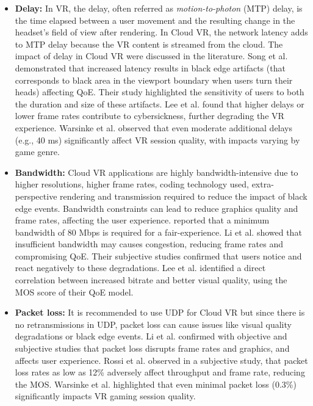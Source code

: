 \begin{itemize}
    \item \textbf{Delay:} In VR, the delay, often referred as \textit{motion-to-photon} (MTP) delay, is the time elapsed between a user movement and the resulting change in the headset's field of view after rendering. In Cloud VR, the network latency adds to MTP delay because the VR content is streamed from the cloud. The impact of delay in Cloud VR were discussed in the literature. Song et al. \cite{song2022impact} demonstrated that increased latency results in black edge artifacts (that corresponds to black area in the viewport boundary when users turn their heads) affecting QoE. Their study highlighted the sensitivity of users to both the duration and size of these artifacts. Lee et al. \cite{lee2024adaptive} found that higher delays or lower frame rates contribute to cybersickness, further degrading the VR experience. Warsinke et al. \cite{warsinke2024vr} observed that even moderate additional delays (e.g., 40 ms) significantly affect VR session quality, with impacts varying by game genre.
    
    \item \textbf{Bandwidth:} Cloud VR applications are highly bandwidth-intensive due to higher resolutions, higher frame rates, coding technology used, extra-perspective rendering and transmission required to reduce the impact of black edge events. Bandwidth constraints can lead to reduce graphics quality and frame rates, affecting the user experience. \cite{huawei} reported that a minimum bandwidth of 80 Mbps is required for a fair-experience. Li et al. \cite{li2020performance} showed that insufficient bandwidth may causes congestion, reducing frame rates and compromising QoE. Their subjective studies confirmed that users notice and react negatively to these degradations. Lee et al. \cite{lee2024adaptive} identified a direct correlation between increased bitrate and better visual quality, using the MOS score of their QoE model.  

    \item \textbf{Packet loss:} It is recommended to use UDP for Cloud VR but since there is no retransmissions in UDP, packet loss can cause issues like visual quality degradations or black edge events. Li et al. \cite{li2020performance} confirmed with objective and subjective studies that packet loss disrupts frame rates and graphics, and affects user experience. Rossi et al. \cite{rossi2024subjective} observed in a subjective study, that packet loss rates as low as 12\% adversely affect throughput and frame rate, reducing the MOS. Warsinke et al. \cite{warsinke2024vr} highlighted that even minimal packet loss (0.3\%) significantly impacts VR gaming session quality.  



\end{itemize}

